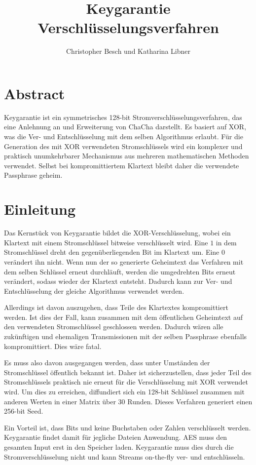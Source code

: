 \documentclass[10pt,a4paper]{article}
\author{Christopher Besch und Katharina Libner}
\title{Keygarantie Verschlüsselungsverfahren}
\begin{document}
\maketitle
\tableofcontents
\newpage

\section{Abstract}

Keygarantie ist ein symmetrisches 128-bit Stromverschlüsselungsverfahren, das eine Anlehnung an und Erweiterung von ChaCha darstellt\cite{Bernstein2008}.
Es basiert auf XOR, was die Ver- und Entschlüsselung mit dem selben Algorithmus erlaubt.
Für die Generation des mit XOR verwendeten Stromschlüssels wird ein komplexer und praktisch unumkehrbarer Mechanismus aus mehreren mathematischen Methoden verwendet.
Selbst bei kompromittiertem Klartext bleibt daher die verwendete Passphrase geheim.

\section{Einleitung}

Das Kernstück von Keygarantie bildet die XOR-Verschlüsselung, wobei ein Klartext mit einem Stromschlüssel bitweise verschlüsselt wird.
Eine $1$ in dem Stromschlüssel dreht den gegenüberliegenden Bit im Klartext um.
Eine $0$ verändert ihn nicht.
Wenn nun der so generierte Geheimtext das Verfahren mit dem selben Schlüssel erneut durchläuft, werden die umgedrehten Bits erneut verändert, sodass wieder der Klartext entsteht.
Dadurch kann zur Ver- und Entschlüsselung der gleiche Algorithmus verwendet werden.

Allerdings ist davon auszugehen, dass Teile des Klartextes kompromittiert werden.
Ist dies der Fall, kann zusammen mit dem öffentlichen Geheimtext auf den verwendeten Stromschlüssel geschlossen werden.
Dadurch wären alle zukünftigen und ehemaligen Transmissionen mit der selben Passphrase ebenfalls kompromittiert.
Dies wäre fatal.

\medskip
Es muss also davon ausgegangen werden, dass unter Umständen der Stromschlüssel öffentlich bekannt ist.
Daher ist sicherzustellen, dass jeder Teil des Stromschlüssels praktisch nie erneut für die Verschlüsselung mit XOR verwendet wird.
Um dies zu erreichen, diffundiert sich ein 128-bit Schlüssel zusammen mit anderen Werten in einer Matrix über 30 Runden.
Dieses Verfahren generiert einen 256-bit Seed.

Ein Vorteil ist, dass Bits und keine Buchstaben oder Zahlen verschlüsselt werden.
Keygarantie findet damit für jegliche Dateien Anwendung.
AES muss den gesamten Input erst in den Speicher laden\cite{Pitchaiah2012}.
Keygarantie muss dies durch die Stromverschlüsselung nicht und kann Streams on-the-fly ver- und entschlüsseln.
\end{document}
